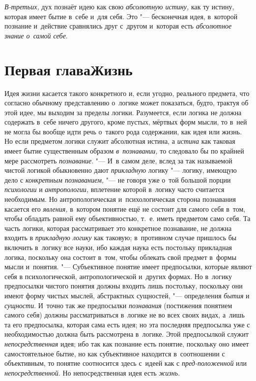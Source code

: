 {\em В-третьих,} дух
познаёт идею как свою {\em абсолютную
истину,} как ту истину, которая имеет бытие в~себе и~для
себя. Это "--- бесконечная идея, в~которой познание и~действие
сравнялись друг с~другом и~которая есть
{\em абсолютное знание о~самой себе}.

\chapter[Первая глава Жизнь]{Первая глава\newline Жизнь}

Идея жизни касается такого конкретного и, если угодно,
реального предмета, что согласно обычному представлению о~логике может
показаться, будто, трактуя об этой идее, мы выходим за пределы логики.
Разумеется, если логика не должна содержать в~себе ничего другого, кроме
пустых, мёртвых форм мысли, то в~ней не могла бы вообще идти речь о~такого
рода содержании, как идея или жизнь. Но если предметом логики служит
абсолютная истина, а {\em истина}
как таковая имеет бытие существенным образом
{\em в~познавании,} то
следовало бы по крайней мере рассмотреть {\em познавание}. "--- И~в
самом деле, вслед за так называемой чистой логикой обыкновенно дают
{\em прикладную} логику "--- логику, имеющую дело с
{\em конкретным познаванием,} "--- не говоря уже о~той большой порции
{\em психологии} и {\em антропологии,}
вплетение которой в~логику часто считается необходимым. Но
антропологическая и~психологическая сторона познавания касается его
{\em явления,} в~котором
понятие ещё не состоит для самого себя в~том, чтобы обладать равной ему
объективностью, т.~е. иметь предметом само себя. Та часть логики, которая
рассматривает это конкретное познавание, не должна входить в
{\em прикладную логику}
как таковую; в~противном случае пришлось бы включить в~логику
все науки, ибо каждая наука есть постольку прикладная логика, поскольку она
состоит в~том, чтобы облекать свой предмет в~формы мысли и~понятия. "---
Субъективное понятие имеет предпосылки, которые являют себя в
психологической, антропологической и~других формах. Но в~логику предпосылки
чистого понятия должны входить лишь постольку, поскольку они имеют форму
чистых мыслей, абстрактных сущностей, "--- определения
{\em бытия} и {\em сущности}. И~точно
так же предпосылки {\em познавания}
(постижения понятием самого себя) должны
рассматриваться в~логике не во всех своих видах, а~лишь та
его предпосылка, которая сама есть идея; но эта последняя предпосылка уже с
необходимостью должна быть рассмотрена в~логике. Этой предпосылкой служит
{\em непосредственная}
идея; ибо так как познание есть понятие, поскольку оно имеет
самостоятельное бытие, но как субъективное находится в~соотношении с
объективным, то понятие соотносится здесь с~идеей как с
{\em пред-положенной} или
{\em непосредственной}.
Но непосредственная идея есть
{\em жизнь}.

